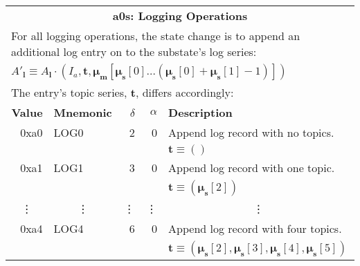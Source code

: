 \documentclass[9pt,oneside]{amsart}
\begin{document}
\begin{tabular*}{\columnwidth}[h]{rlrrl}
\toprule
\multicolumn{5}{c}{\textbf{a0s: Logging Operations}} \vspace{5pt} \\
\multicolumn{5}{l}{For all logging operations, the state change is to append an additional log entry on to the substate's log series:}\\
\multicolumn{5}{l}{$A'_\mathbf{l} \equiv A_\mathbf{l} \cdot (I_a, \mathbf{t}, \boldsymbol{\mu}_\mathbf{m}[ \boldsymbol{\mu}_\mathbf{s}[0] \dots (\boldsymbol{\mu}_\mathbf{s}[0] + \boldsymbol{\mu}_\mathbf{s}[1] - 1) ])$}\\
\multicolumn{5}{l}{The entry's topic series, $\mathbf{t}$, differs accordingly:}\vspace{5pt} \\
\textbf{Value} & \textbf{Mnemonic} & $\delta$ & $\alpha$ & \textbf{Description} \vspace{5pt} \\
0xa0 & {\small LOG0} & 2 & 0 & Append log record with no topics. \\
&&&& $\mathbf{t} \equiv ()$ \\
\midrule
0xa1 & {\small LOG1} & 3 & 0 & Append log record with one topic. \\
&&&& $\mathbf{t} \equiv (\boldsymbol{\mu}_\mathbf{s}[2])$ \\
\midrule
\multicolumn{1}{c}{\vdots} & \multicolumn{1}{c}{\vdots} & \vdots & \vdots & \multicolumn{1}{c}{\vdots} \\
\midrule
0xa4 & {\small LOG4} & 6 & 0 & Append log record with four topics. \\
&&&& $\mathbf{t} \equiv (\boldsymbol{\mu}_\mathbf{s}[2], \boldsymbol{\mu}_\mathbf{s}[3], \boldsymbol{\mu}_\mathbf{s}[4], \boldsymbol{\mu}_\mathbf{s}[5])$ \\
\bottomrule
\end{tabular*}
\end{document}
